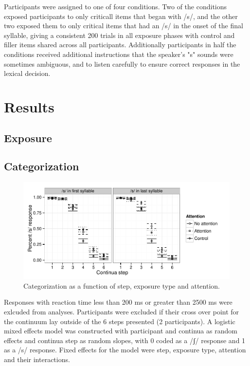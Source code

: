 \documentclass[a4paper,11pt,twocolumn]{article}
\begin{document}
Participants were assigned to one of four conditions.  Two of the conditions exposed participants to only criticall items that began with /s/, and the other two exposed them to only critical items that had an /s/ in the onset of the final syllable, giving a consistent 200 trials in all exposure phases with control and filler items shared across all participants.  Additionally participants in half the conditions received additional instructions that the speaker's "s" sounds were sometimes ambiguous, and to listen carefully to ensure correct responses in the lexical decision.

\section{Results}

\subsection{Exposure}

\subsection{Categorization}

\begin{figure}[!ht]
\caption{Categorization as a function of step, exposure type and attention.}\label{fig:categ}
\begin{center}
\includegraphics[width=\textwidth]{categresults}
\end{center}
\end{figure}

Responses with reaction time less than 200 ms or greater than 2500 ms were exlcuded from analyses.  Participants were excluded if their cross over point for the continuum lay outside of the 6 steps presented (2 participants).  A logistic mixed effects model was constructed with participant and continua as random effects and continua step as random slopes, with 0 coded as a /ʃ/ response and 1 as a /s/ response.  Fixed effects for the model were step, exposure type, attention and their interactions.
\end{document}
